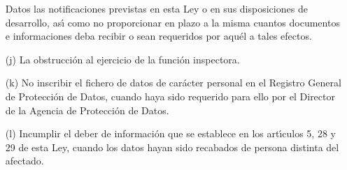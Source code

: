 \begin{itemize}
Datos las notificaciones previstas en esta Ley o en sus disposiciones
de desarrollo, as\'{\i} como no proporcionar en plazo a la misma cuantos
documentos e informaciones deba recibir o sean requeridos por aqu\'el a
tales efectos.  \item [(j)] La obstrucci\'on al ejercicio de la funci\'on
inspectora.  \item [(k)] No inscribir el fichero de datos de car\'acter
personal en el Registro General de Protecci\'on de Datos, cuando haya
sido requerido para ello por el Director de la Agencia de Protecci\'on de
Datos.  \item [(l)] Incumplir el deber de informaci\'on que se establece
en los art\'{\i}culos 5, 28 y 29 de esta Ley, cuando los datos hayan
sido recabados de persona distinta del afectado.  \end{itemize}

